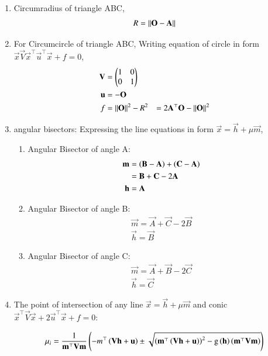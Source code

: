 \documentclass[journal,12pt,twocolumn]{IEEEtran}
\begin{document}
\begin{enumerate}
\item Circumradius of triangle ABC,
	\begin{align}
		R &= \left\lVert\mathbf{O}-\mathbf{A}\right\rVert\\
	\end{align}
\item For Circumcircle of triangle ABC,
	Writing equation of circle in form $\vec{x}\vec{V}\vec{x}^{\top} 
		\vec{u}^{\top}\vec{x} + f = 0$,
		\begin{align}
			\mathbf{V} &= \begin{pmatrix}1&0\\0&1\end{pmatrix}\\
			\mathbf{u} &= -\mathbf{O}\\
			f &= \left\lVert\mathbf{O}\right\rVert^2 - R^2
				&= 2\mathbf{A}^{\top} \mathbf{O} - \left\lVert\mathbf{O}\right\rVert^2
		\end{align}

\item angular bisectors:
	Expressing the line equations in form $\vec{x} = \vec{h} + \mu\vec{m}$,
	\begin{enumerate}
		\item Angular Bisector of angle A:
			\begin{align}
				\mathbf{m} &= \left(\mathbf{B} - \mathbf{A}\right) + \left(\mathbf{C}-\mathbf{A}\right) \\
						&= \mathbf{B} + \mathbf{C} - 2\mathbf{A}\\
				\mathbf{h} &= \mathbf{A}
			\end{align}
		\item Angular Bisector of angle B:
			\begin{align}
				\vec{m} = \vec{A} +\vec{C}  - 2\vec{B}\\
				\vec{h} = \vec{B}
			\end{align}
		\item Angular Bisector of angle C:
			\begin{align}
				\vec{m} = \vec{A} + \vec{B}  - 2\vec{C}\\
				\vec{h} = \vec{C}
			\end{align}
	\end{enumerate}


\item The point of intersection of any line $\vec{x}= \vec{h} + \mu\vec{m}$ and conic $\vec{x}^{\top}\vec{V}\vec{x} +2\vec{u}^{\top}\vec{x} +f =0$:

	\begin{multline}
        \mu_i = \frac{1}{\mathbf{m}^{\top}\mathbf{V}\mathbf{m}} \left(-m^{\top}\left(\mathbf{V}\mathbf{h}+\mathbf{u}\right) \pm \sqrt{\left(\mathbf{m}^{\top}\left(\mathbf{V}\mathbf{h}+\mathbf{u}\right)\right)^2 - \text{g}\left(\mathbf{h}\right)\left(\mathbf{m}^{\top}\mathbf{V}\mathbf{m}\right)}\right)
\end{multline}


\end{enumerate}
\end{document}
